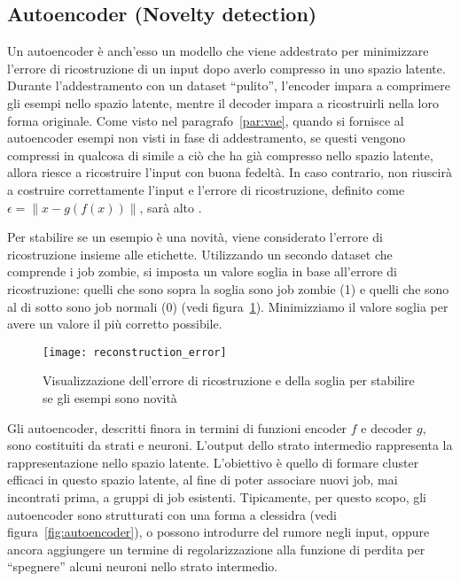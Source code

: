 \subsection{Autoencoder (Novelty detection)}
\label{sec:autoencoder}

Un autoencoder è anch'esso un modello che viene addestrato per minimizzare
l'errore di ricostruzione di un input dopo averlo compresso in uno spazio
latente. Durante l'addestramento con un dataset ``pulito'', l'encoder impara a
comprimere gli esempi nello spazio latente, mentre il decoder impara a
ricostruirli nella loro forma originale. Come visto nel
paragrafo~\ref{par:vae}, quando si fornisce al autoencoder esempi non visti in
fase di addestramento, se questi vengono compressi in qualcosa di simile a ciò
che ha già compresso nello spazio latente, allora riesce a ricostruire l'input
con buona fedeltà. In caso contrario, non riuscirà a costruire correttamente
l'input e l'errore di ricostruzione, definito come $\epsilon=\lVert
x-g(f(x))\rVert$, sarà alto \cite{borghesi2019}.

Per stabilire se un esempio è una novità, viene considerato l'errore di
ricostruzione insieme alle etichette. Utilizzando un secondo dataset che
comprende i job zombie, si imposta un valore soglia in base all'errore di
ricostruzione: quelli che sono sopra la soglia sono job zombie (1) e quelli
che sono al di sotto sono job normali (0) (vedi
figura~\ref{fig:reconstruction_error}). Minimizziamo il valore soglia per
avere un valore il più corretto possibile.

\begin{figure}[!ht]
    \centering
    \texttt{[image: reconstruction\_error]}
    \caption{Visualizzazione dell'errore di ricostruzione e della soglia per
    stabilire se gli esempi sono novità}
    \label{fig:reconstruction_error}
\end{figure}

Gli autoencoder, descritti finora in termini di funzioni encoder $f$ e decoder
$g$, sono costituiti da strati e neuroni. L'output dello strato intermedio
rappresenta la rappresentazione nello spazio latente. L'obiettivo è quello di
formare cluster efficaci in questo spazio latente, al fine di poter associare
nuovi job, mai incontrati prima, a gruppi di job esistenti. Tipicamente, per
questo scopo, gli autoencoder sono strutturati con una forma a clessidra (vedi
figura~\ref{fig:autoencoder}), o possono introdurre del rumore negli input,
oppure ancora aggiungere un termine di regolarizzazione alla funzione di
perdita per ``spegnere'' alcuni neuroni nello strato intermedio.

